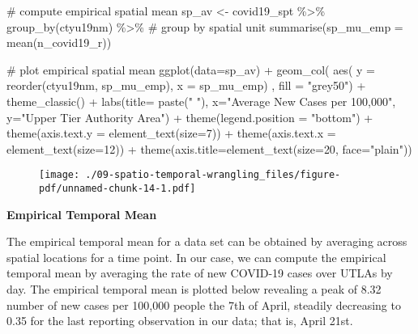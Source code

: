 \documentclass[
  letterpaper,
  krantz2]{style/krantz}
\newenvironment{Shaded}{\begin{snugshade}}{\end{snugshade}}
\newcommand{\AttributeTok}[1]{\textcolor[rgb]{0.40,0.45,0.13}{#1}}
\newcommand{\CommentTok}[1]{\textcolor[rgb]{0.37,0.37,0.37}{#1}}
\newcommand{\DecValTok}[1]{\textcolor[rgb]{0.68,0.00,0.00}{#1}}
\newcommand{\FunctionTok}[1]{\textcolor[rgb]{0.28,0.35,0.67}{#1}}
\newcommand{\NormalTok}[1]{\textcolor[rgb]{0.00,0.23,0.31}{#1}}
\newcommand{\OtherTok}[1]{\textcolor[rgb]{0.00,0.23,0.31}{#1}}
\newcommand{\SpecialCharTok}[1]{\textcolor[rgb]{0.37,0.37,0.37}{#1}}
\newcommand{\StringTok}[1]{\textcolor[rgb]{0.13,0.47,0.30}{#1}}
\begin{document}
\begin{Shaded}
\begin{Highlighting}[]
\CommentTok{\# compute empirical spatial mean}
\NormalTok{sp\_av }\OtherTok{\textless{}{-}}\NormalTok{ covid19\_spt }\SpecialCharTok{\%\textgreater{}\%} \FunctionTok{group\_by}\NormalTok{(ctyu19nm) }\SpecialCharTok{\%\textgreater{}\%} \CommentTok{\# group by spatial unit}
  \FunctionTok{summarise}\NormalTok{(}\AttributeTok{sp\_mu\_emp =} \FunctionTok{mean}\NormalTok{(n\_covid19\_r))}

\CommentTok{\# plot empirical spatial mean}
\FunctionTok{ggplot}\NormalTok{(}\AttributeTok{data=}\NormalTok{sp\_av) }\SpecialCharTok{+}
  \FunctionTok{geom\_col}\NormalTok{( }\FunctionTok{aes}\NormalTok{( }\AttributeTok{y =} \FunctionTok{reorder}\NormalTok{(ctyu19nm, sp\_mu\_emp), }\AttributeTok{x =}\NormalTok{ sp\_mu\_emp) , }\AttributeTok{fill =} \StringTok{"grey50"}\NormalTok{) }\SpecialCharTok{+}
  \FunctionTok{theme\_classic}\NormalTok{() }\SpecialCharTok{+}
  \FunctionTok{labs}\NormalTok{(}\AttributeTok{title=} \FunctionTok{paste}\NormalTok{(}\StringTok{" "}\NormalTok{), }\AttributeTok{x=}\StringTok{"Average New Cases per 100,000"}\NormalTok{, }\AttributeTok{y=}\StringTok{"Upper Tier Authority Area"}\NormalTok{) }\SpecialCharTok{+}
  \FunctionTok{theme}\NormalTok{(}\AttributeTok{legend.position =} \StringTok{"bottom"}\NormalTok{) }\SpecialCharTok{+}
  \FunctionTok{theme}\NormalTok{(}\AttributeTok{axis.text.y =} \FunctionTok{element\_text}\NormalTok{(}\AttributeTok{size=}\DecValTok{7}\NormalTok{)) }\SpecialCharTok{+}
  \FunctionTok{theme}\NormalTok{(}\AttributeTok{axis.text.x =} \FunctionTok{element\_text}\NormalTok{(}\AttributeTok{size=}\DecValTok{12}\NormalTok{)) }\SpecialCharTok{+}
  \FunctionTok{theme}\NormalTok{(}\AttributeTok{axis.title=}\FunctionTok{element\_text}\NormalTok{(}\AttributeTok{size=}\DecValTok{20}\NormalTok{, }\AttributeTok{face=}\StringTok{"plain"}\NormalTok{))}
\end{Highlighting}
\end{Shaded}

\begin{figure}[H]

{\centering \texttt{[image: ./09-spatio-temporal-wrangling\_files/figure-pdf/unnamed-chunk-14-1.pdf]}

}

\end{figure}

\textbf{Empirical Temporal Mean}

The empirical temporal mean for a data set can be obtained by averaging
across spatial locations for a time point. In our case, we can compute
the empirical temporal mean by averaging the rate of new COVID-19 cases
over UTLAs by day. The empirical temporal mean is plotted below
revealing a peak of 8.32 number of new cases per 100,000 people the 7th
of April, steadily decreasing to 0.35 for the last reporting observation
in our data; that is, April 21st.
\end{document}
